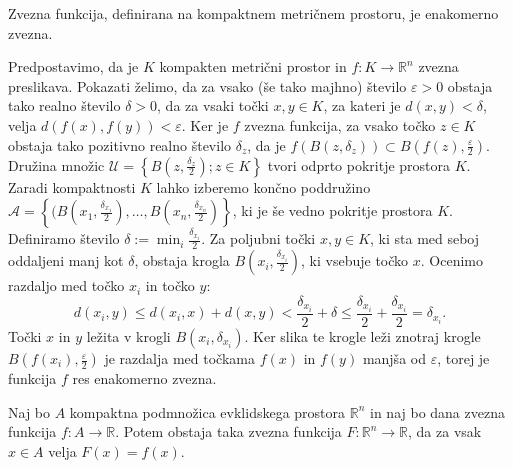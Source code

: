 \documentclass[mat1]{fmfdelo}
\newcommand{\R}{\mathbb R}
\newcommand{\0}{0}
\newcommand{\pA}{\mathcal A}
\newcommand{\pU}{\mathcal U}
\begin{document}
\begin{trditev}\label{trd:zvjeenakzv}
Zvezna funkcija, definirana na kompaktnem metričnem prostoru, je enakomerno zvezna.
\end{trditev}
\begin{dokaz}
Predpostavimo, da je $K$ kompakten metrični prostor in $f : K \to \R^n$ zvezna preslikava. Pokazati želimo, da za vsako (še tako majhno) število $\varepsilon > 0$ obstaja tako realno število $\delta > 0$, da za vsaki točki $x, y \in K$, za kateri je $d(x, y) < \delta$, velja $d(f(x), f(y)) < \varepsilon$. Ker je $f$ zvezna funkcija, za vsako točko $z \in K$ obstaja tako pozitivno realno število $\delta_z$, da je $f(B(z, \delta_z)) \subset B(f(z), \frac{\varepsilon}{2})$. Družina množic $\pU = \left \{ B(z, \frac{\delta_z}{2}); z \in K \right \}$ tvori odprto pokritje prostora $K$.  Zaradi kompaktnosti $K$ lahko izberemo končno poddružino $\pA =  \left \{ (B(x_1, \frac{\delta_{x_1}}{2}), \dots, B(x_n, \frac{\delta_{x_n}}{2}) \right \}$, ki je še vedno pokritje prostora $K$. Definiramo število $\delta := \min_i \frac{\delta_{x_i}}{2}$. Za poljubni točki $x, y \in K$, ki sta med seboj oddaljeni manj kot $\delta$, obstaja krogla $B(x_i, \frac{\delta_{x_i}}{2})$, ki vsebuje točko $x$. Ocenimo razdaljo med točko $x_i$ in točko $y$:
$$d(x_i, y) \leq d(x_i, x) + d(x, y) < \frac{\delta_{x_i}}{2} +\delta \leq \frac{\delta_{x_i}}{2} + \frac{\delta_{x_i}}{2} = \delta_{x_i}.$$
Točki $x$ in $y$ ležita v krogli $B(x_i, \delta_{x_i})$. Ker slika te krogle leži znotraj krogle $B(f(x_i), \frac{\varepsilon}{2})$ je razdalja med točkama $f(x)$ in $f(y)$ manjša od $\varepsilon$, torej je funkcija $f$ res enakomerno zvezna.
\end{dokaz}

\begin{lema}\label{lem:razsiritev}
Naj bo $A$ kompaktna podmnožica evklidskega prostora $\R^n$ in naj bo dana zvezna funkcija $f : A \to \R$. Potem obstaja taka zvezna funkcija $F : \R^n \to \R$, da za vsak $x \in A$ velja $F(x) = f(x)$.
\end{lema}
\end{document}
